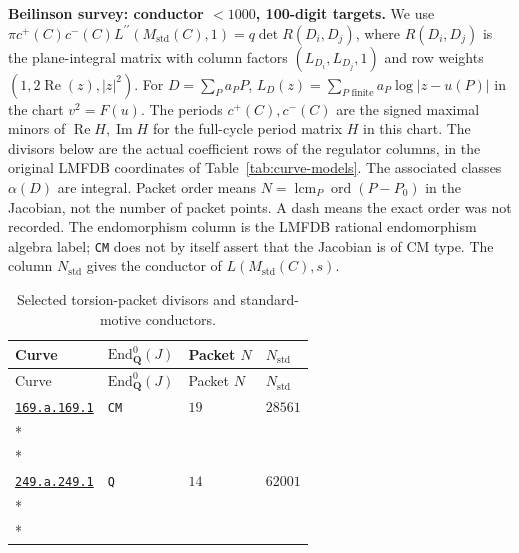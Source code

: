 \documentclass[10pt]{article}
\newcommand{\entryseparator}{\noalign{\vskip3pt\hbox to\linewidth{\leaders\hbox{\kern2pt\rule{3pt}{0.3pt}\kern2pt}\hfill}\nobreak\vskip3pt\nobreak}}
\begin{document}
\begin{landscape}
\noindent\textbf{Beilinson survey: conductor $<1000$, 100-digit targets.}
We use $\pi c^+(C)c^-(C)L^{\prime\prime}(M_{\mathrm{std}}(C),1)=q\det R(D_i,D_j)$,
where $R(D_i,D_j)$ is the plane-integral matrix with column factors $(L_{D_i},L_{D_j},1)$
and row weights $(1,2\operatorname{Re}(z),|z|^2)$.
For $D=\sum_P a_P P$, $L_D(z)=\sum_{P\text{ finite}}a_P\log|z-u(P)|$ in the chart $v^2=F(u)$.
The periods $c^+(C),c^-(C)$ are the signed maximal minors of $\operatorname{Re}H,\operatorname{Im}H$
for the full-cycle period matrix $H$ in this chart.
The divisors below are the actual coefficient rows of the regulator columns,
in the original LMFDB coordinates of Table~\ref{tab:curve-models}.
The associated classes $\alpha(D)$ are integral.
Packet order means $N=\mathop{\mathrm{lcm}}_P\operatorname{ord}(P-P_0)$ in the Jacobian,
not the number of packet points. A dash means the exact order was not recorded.
The endomorphism column is the LMFDB rational endomorphism algebra label;
\texttt{CM} does not by itself assert that the Jacobian is of CM type.
The column $N_{\mathrm{std}}$ gives the conductor of $L(M_{\mathrm{std}}(C),s)$.
\begin{longtable}{@{}p{.4\linewidth}>{\centering\arraybackslash}p{.2\linewidth}>{\raggedleft\arraybackslash}p{.16\linewidth}>{\raggedleft\arraybackslash}p{}@{}}
\caption{Selected torsion-packet divisors and standard-motive conductors.}\label{tab:torsion-integrality}\\
\toprule Curve & $\mathrm{End}_{\mathbf Q}^0(J)$ & Packet $N$ & $N_{\mathrm{std}}$ \\
\midrule\endfirsthead
\toprule Curve & $\mathrm{End}_{\mathbf Q}^0(J)$ & Packet $N$ & $N_{\mathrm{std}}$ \\
\midrule\endhead
\bottomrule\endfoot
\href{https://www.lmfdb.org/Genus2Curve/Q/169/a/169/1}{\texttt{169.a.169.1}} & \texttt{CM} & $19$ & $28561$ \\*
\multicolumn{4}{@{}l@{}}{$D_{1}=\left(-1,0\right)+\left(-1,1\right)-\infty_{Y=-1}-\infty_{Y=0}$} \\*
\multicolumn{4}{@{}l@{}}{$D_{2}=\left(0,-1\right)+\left(0,0\right)-\infty_{Y=-1}-\infty_{Y=0}$} \\
\entryseparator
\href{https://www.lmfdb.org/Genus2Curve/Q/249/a/249/1}{\texttt{249.a.249.1}} & \texttt{Q} & $14$ & $62001$ \\*
\multicolumn{4}{@{}l@{}}{$D_{1}=2\,\left(-1,0\right)-\infty_{Y=-1}-\infty_{Y=0}$} \\*

\end{longtable}
\end{landscape}
\end{document}
